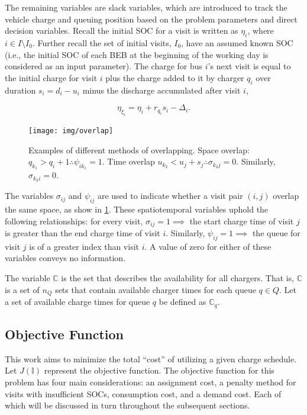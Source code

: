 \documentclass[ee,thesis]{usuthesis}
\newcommand{\I}{\mathbb{I}}                 %
\newcommand{\C}{\mathbb{C}}                 %
\newcommand{\Iset}{I}                       %
\begin{document}
The remaining variables are slack variables, which are introduced to track the vehicle charge and queuing position based
on the problem parameters and direct decision variables. Recall the initial SOC for a visit is written as \(\eta_i\), where
\(i \in \Iset \setminus \Iset_0\). Further recall the set of initial visits, \(\Iset_0\), have an assumed known SOC (i.e., the initial
SOC of each BEB at the beginning of the working day is considered as an input parameter). The charge for bus \(i\)'s next
visit is equal to the initial charge for visit \(i\) plus the charge added to it by charger \(q_i\) over duration \(s_i =
d_i - u_i\) minus the discharge accumulated after visit \(i\),

\begin{equation}
\label{eq:bat-chain}
  \eta_{\xi_i} = \eta_i + r_{q_i}s_i - \Delta_i\text{.}
\end{equation}

\begin{figure}
    \centering
    \texttt{[image: img/overlap]}
    \caption{Examples of different methods of overlapping. Space overlap: $q_{k_1} > q_{i} + 1 \therefore \psi_{ik_{1}} = 1$.
      Time overlap $u_{k_2} < u_{j} + s_j \therefore \sigma_{k_{2}j} = 0$. Similarly, $\sigma_{k_3 i} = 0$.}
    \label{fig:overlap}
  \end{figure}

The variables \(\sigma_{ij}\) and \(\psi_{ij}\) are used to indicate whether a visit pair \((i, j)\) overlap the same space, as show
in \ref{fig:overlap}. These spatiotemporal variables uphold the following relationships: for every
visit, \(\sigma_{ij} = 1 \implies\) the start charge time of visit \(j\) is greater than the end charge time of visit \(i\).
Similarly, \(\psi_{ij} = 1 \implies\) the queue for visit \(j\) is of a greater index than visit \(i\). A value of zero for
either of these variables conveys no information.

The variable \(\C\) is the set that describes the availability for all chargers. That is, \(\C\) is a set of \(n_Q\) sets that
contain available charger times for each queue \(q \in Q\). Let a set of available charge times for queue \(q\) be defined as
\(\C_q\).

\subsection{Objective Function}
\label{sec:sa-objective-function}
This work aims to minimize the total ``cost'' of utilizing a given charge schedule. Let \(J(\I)\) represent the objective
function. The objective function for this problem has four main considerations: an assignment cost, a penalty method for
visits with insufficient SOCs, consumption cost, and a demand cost. Each of which will be discussed in turn throughout
the subsequent sections.
\end{document}
